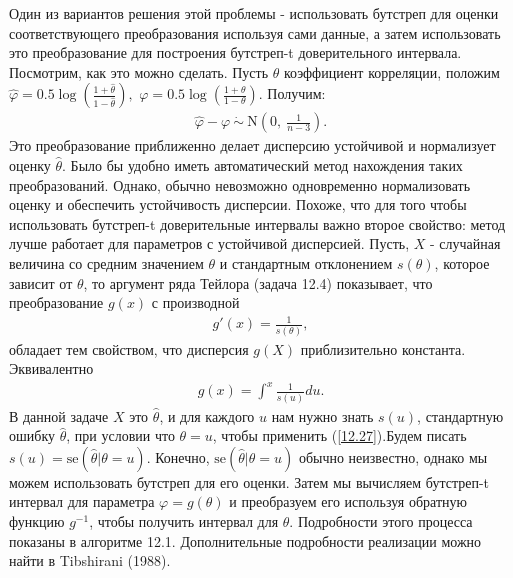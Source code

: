 Один из вариантов решения этой проблемы - использовать бутстреп для оценки соответствующего преобразования используя сами данные, а затем использовать это преобразование для построения бутстреп-t доверительного интервала. Посмотрим, как это можно сделать. Пусть $\theta$ коэффициент корреляции, положим $\widehat{\varphi} = 0.5 \log(\frac{1+\widehat{\theta}}{1 - \widehat{\theta}}),$ $\varphi = 0.5 \log(\frac{1+\theta}{1 - \theta})$. Получим:
\begin{gather}\label{12.25}
\hat{\varphi} - \varphi \  \dot{\sim} \  \mathrm{N}(0, \ \frac{1}{n - 3}).
\end{gather}
Это преобразование приближенно делает дисперсию устойчивой и нормализует оценку $\widehat{\theta}$. Было бы удобно иметь автоматический метод нахождения таких преобразований. Однако, обычно невозможно одновременно нормализовать оценку и обеспечить устойчивость дисперсии. Похоже, что для того чтобы использовать бутстреп-t доверительные интервалы важно второе свойство: метод лучше работает для параметров с устойчивой дисперсией. Пусть, $X$ - случайная величина со средним значением $\theta$ и стандартным отклонением $s(\theta)$, которое зависит от $\theta$, то аргумент ряда Тейлора (задача 12.4) показывает, что преобразование $g(x)$ с производной
\begin{gather}\label{12.26}
g'(x) = \frac{1}{s(\theta)},
\end{gather}
обладает тем свойством, что дисперсия $g(X)$ приблизительно константа. Эквивалентно 
\begin{gather}\label{12.27}
g(x) = \int_{}^x \frac{1}{s(u)}du.
\end{gather}
В данной задаче $X$ это $\widehat{\theta}$, и для каждого $u$ нам нужно знать $s (u)$, стандартную ошибку $\widehat{\theta}$, при условии что $\theta = u$, чтобы применить (\ref{12.27}).Будем писать $s(u) = \text{se}(\widehat{\theta}|\theta = u)$. Конечно, $\text{se}(\widehat{\theta}|\theta = u)$ обычно неизвестно, однако мы можем использовать бутстреп для его оценки. Затем мы вычисляем бутстреп-t интервал для параметра $\varphi = g(\theta)$ и преобразуем его используя обратную функцию $g^{-1}$, чтобы получить интервал для $\theta$. Подробности этого процесса показаны в алгоритме 12.1. Дополнительные подробности реализации можно найти в Tibshirani (1988).

